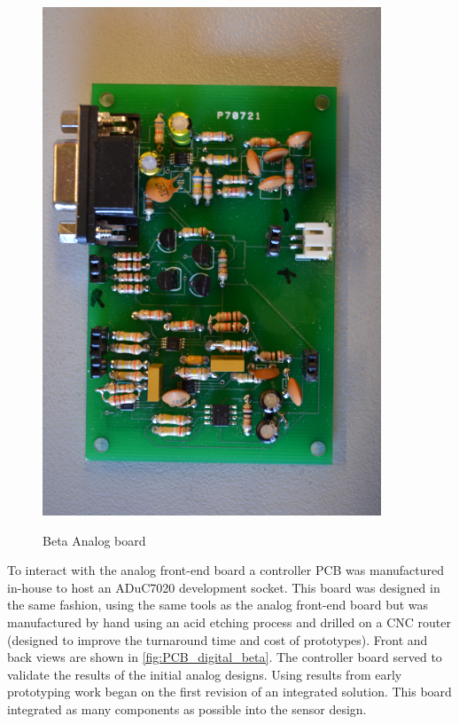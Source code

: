 \begin{figure}
	\begin{center}
		\label{fig:PCB_analog_beta}
		\includegraphics[scale=1,width=0.9\textwidth]{Images/PCB_AnalogBeta.JPG} 
		\caption{Beta Analog board}
	\end{center}
\end{figure}

To interact with the analog front-end board a controller PCB was manufactured in-house to host an ADuC7020 development socket. This board was designed in the same fashion, using the same tools as the analog front-end board but was manufactured by hand using an acid etching process and drilled on a CNC router (designed to improve the turnaround time and cost of prototypes). Front and back views are shown in \cref{fig:PCB_digital_beta}. The controller board served to validate the results of the initial analog designs. Using results from early prototyping work began on the first revision of an integrated solution. This board integrated as many components as possible into the sensor design.

